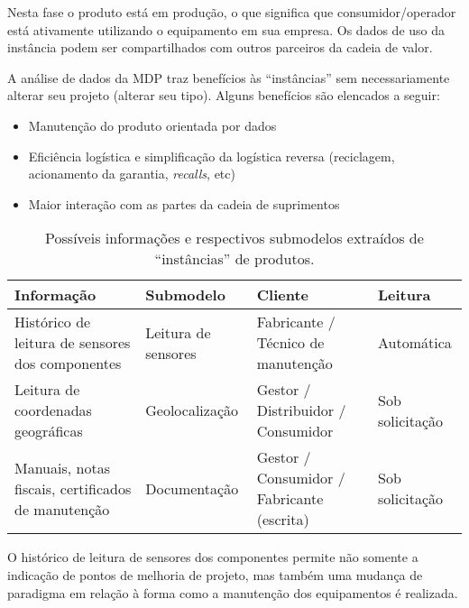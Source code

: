 	Nesta fase o produto está em produção, o que significa que consumidor/operador está ativamente utilizando o equipamento em sua empresa. Os dados de uso da instância podem ser compartilhados com outros parceiros da cadeia de valor.
	
	A análise de dados da MDP traz benefícios às ``instâncias'' sem necessariamente alterar seu projeto (alterar seu tipo). Alguns benefícios são elencados a seguir:	

	\begin{itemize}
		\item Manutenção do produto orientada por dados
		\item Eficiência logística e simplificação da logística reversa (reciclagem, acionamento da garantia, \textit{recalls}, etc)
		\item Maior interação com as partes da cadeia de suprimentos
	\end{itemize}

	\begin{table}[htb]
		\centering
		\caption{Possíveis informações e respectivos submodelos extraídos de ``instâncias'' de produtos.}
		\label{tab:produto-instancia}
		\begin{tabular}{p{4cm}p{3cm}p{3cm}p{4cm}}
			
			\hline
			\textbf{Informação}
			& \textbf{Submodelo}
			& \textbf{Cliente}
			& \textbf{Leitura}	
			\\
			
			\hline
			Histórico de leitura de sensores dos componentes
			& Leitura de sensores
			& Fabricante / Técnico de manutenção
			& Automática
			\\
			
			\hline
			Leitura de coordenadas geográficas
			& Geolocalização
			& Gestor / Distribuidor / Consumidor
			& Sob solicitação
			\\
			
			\hline
			Manuais, notas fiscais, certificados de manutenção
			& Documentação
			& Gestor / Consumidor / Fabricante (escrita)
			& Sob solicitação
			\\

			\hline
		\end{tabular}
	\end{table}

	O histórico de leitura de sensores dos componentes permite não somente a indicação de pontos de melhoria de projeto, mas também uma mudança de paradigma em relação à forma como a manutenção dos equipamentos é realizada.
	
